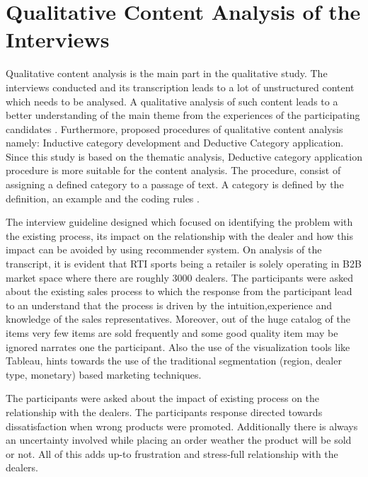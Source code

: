 \section{Qualitative Content Analysis of the Interviews}
Qualitative content analysis is the main part in the qualitative study. The interviews conducted and its transcription leads to a lot of unstructured content which needs to be analysed. A qualitative analysis of such content leads to a better understanding of the main theme from the experiences of the participating candidates \autocite[10]{bengtsson2016plan}. Furthermore, \textcite[3]{mayring2014qualitative} proposed procedures of qualitative content analysis namely: Inductive category development and Deductive Category application. Since this study is based on the thematic analysis, Deductive category application procedure is more suitable for the content analysis. The procedure, consist of assigning a defined category to a passage of text. A category is defined by the definition, an example and the coding rules \autocite[5]{mayring2014qualitative}. \\ 
\par
The interview guideline designed which focused on identifying the problem with the existing process, its impact on the relationship with the dealer and how this impact can be avoided by using recommender system. On analysis of the transcript, it is evident that RTI sports being a retailer is solely operating in B2B market space where there are roughly 3000 dealers. The participants were asked about the existing sales process  to which the response from the participant lead to an understand that the process is driven by the intuition,experience and knowledge of the sales representatives. Moreover, out of the huge catalog of the items very few items are sold frequently and some good quality item may be ignored narrates one the participant. Also the use of the visualization tools like Tableau, hints towards the use of the traditional segmentation (region, dealer type, monetary) based marketing techniques. \\ 
\par
The participants were asked about the impact of existing process on the relationship with the dealers. The participants response directed towards dissatisfaction when wrong products were promoted. Additionally there is always an uncertainty involved while placing an order weather the product will be sold or not. All of this adds up-to frustration and stress-full relationship with the dealers. \\

